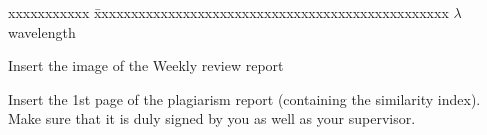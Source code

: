 \documentclass[BTech]{iiitdmdiss}
\begin{document}
\pagebreak


\notation
\noindent
\begin{singlespace}
\begin{tabbing}
xxxxxxxxxxx \= xxxxxxxxxxxxxxxxxxxxxxxxxxxxxxxxxxxxxxxxxxxxxxxx \kill
\textbf{$\lambda$}  \> wavelength \\

\end{tabbing}
\end{singlespace}

\pagebreak
\clearpage

\pagestyle{fancy}
\fancyhf{}

\fancyhead[l]{\leftmark}
\fancyfoot[r]{\thepage}







\appendix




\begin{singlespace}
  
\end{singlespace}

\pagebreak
\weeklyreport
Insert the image of the Weekly review report

\pagebreak
\plagiarism
Insert the 1st page of the plagiarism report (containing the similarity index). Make sure that it is duly signed by you as well as your supervisor.
\end{document}
